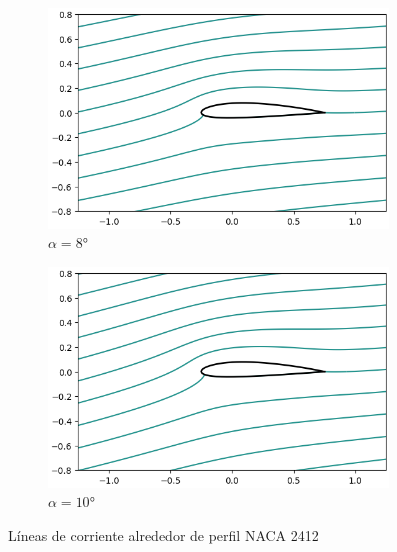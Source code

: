 \documentclass[letterpaper, openright, 12pt]{book}
\begin{document}
\begin{figure}
\begin{subfigure}[c]{0.48\textwidth}
            \includegraphics[keepaspectratio, width=0.99\textwidth]
                {./img/potential_flow_2412_stream_8}
            \caption{$\alpha = 8\si{\degree}$}
            \label{fig:potential_flow_2412_stream_8}
        \end{subfigure}
        \hfill
        \begin{subfigure}[c]{0.48\textwidth}
            \includegraphics[keepaspectratio, width=0.99\textwidth]
                {./img/potential_flow_2412_stream_10}
            \caption{$\alpha = 10\si{\degree}$}
        \end{subfigure}
        \caption{Líneas de corriente alrededor de perfil NACA 2412}
        \label{fig:potential_flow_2412_stream__1}
    \end{figure}
\end{document}
